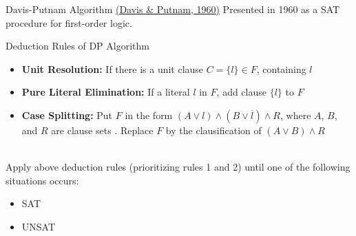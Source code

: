\documentclass[t]{sdqbeamer}
\begin{document}
\begin{frame}{Davis-Putnam Algorithm \href{http://doi.acm.org/10.1145/321033.321034}{(Davis \& Putnam, 1960)}}
Presented in 1960 as a SAT procedure for first-order logic.
\begin{block}{Deduction Rules of DP Algorithm}
\begin{itemize}\setlength{\itemsep}{1em}
	\item \textbf{Unit Resolution:} If there is a unit clause $C = \{ l \} \in F$, 
	 containing $l$
	\item \textbf{Pure Literal Elimination:} If a literal $l$  in $F$,
	add clause $\{ l \}$ to $F$
	\item \textbf{Case Splitting:} Put $F$ in the form $(A \lor l) \land (B \lor \overline{l}) \land R$,
	where $A$, $B$, and $R$ are clause sets .
	Replace $F$ by the clausification of $(A \lor B) \land R$
\end{itemize}~\\
Apply above deduction rules (prioritizing rules 1 and 2) until one of the following situations occurs: 
\begin{itemize}
	\item {} SAT
	\item {} UNSAT
\end{itemize}
\end{block}
\end{frame}
\end{document}
